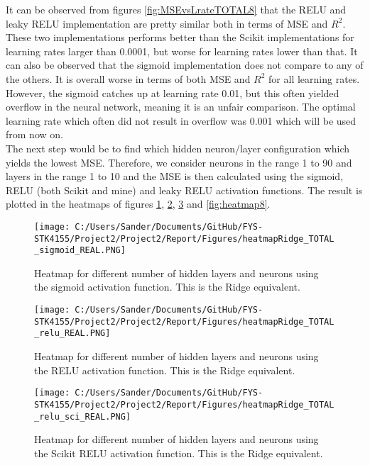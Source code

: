 \documentclass[12pt,a4paper]{article}
\begin{document}
\noindent It can be observed from figures \ref{fig:MSEvsLrateTOTAL8} that the RELU and leaky RELU implementation are pretty similar both in terms of MSE and $R^2$. These two implementations performs better than the Scikit implementations for learning rates larger than 0.0001, but worse for learning rates lower than that. It can also be observed that the sigmoid implementation does not compare to any of the others. It is overall worse in terms of both MSE and $R^2$ for all learning rates. However, the sigmoid catches up at learning rate 0.01, but this often yielded overflow in the neural network, meaning it is an unfair comparison. The optimal learning rate which often did not result in overflow was 0.001 which will be used from now on.
\\
The next step would be to find which hidden neuron/layer configuration which yields the lowest MSE. Therefore, we consider neurons in the range 1 to 90 and layers in the range 1 to 10 and the MSE is then calculated using the sigmoid, RELU (both Scikit and mine) and leaky RELU activation functions. The result is plotted in the heatmaps of figures \ref{fig:heatmap5}, \ref{fig:heatmap6}, \ref{fig:heatmap7} and \ref{fig:heatmap8}.

\begin{figure}[H]
\centering
\texttt{[image: C:/Users/Sander/Documents/GitHub/FYS-STK4155/Project2/Project2/Report/Figures/heatmapRidge\_TOTAL\_sigmoid\_REAL.PNG]}
\caption{\label{fig:heatmap5} Heatmap for different number of hidden layers and neurons using the sigmoid activation function. This is the Ridge equivalent.}
\end{figure}

\begin{figure}[H]
\centering
\texttt{[image: C:/Users/Sander/Documents/GitHub/FYS-STK4155/Project2/Project2/Report/Figures/heatmapRidge\_TOTAL\_relu\_REAL.PNG]}
\caption{\label{fig:heatmap6} Heatmap for different number of hidden layers and neurons using the RELU activation function. This is the Ridge equivalent.}
\end{figure}

\begin{figure}[H]
\centering
\texttt{[image: C:/Users/Sander/Documents/GitHub/FYS-STK4155/Project2/Project2/Report/Figures/heatmapRidge\_TOTAL\_relu\_sci\_REAL.PNG]}
\caption{\label{fig:heatmap7} Heatmap for different number of hidden layers and neurons using the Scikit RELU activation function. This is the Ridge equivalent.}
\end{figure}
\end{document}
